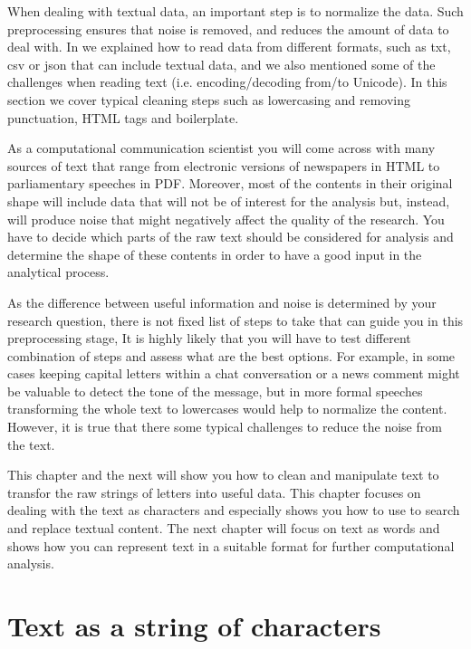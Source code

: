 When dealing with textual data, an important step is to normalize the data. Such preprocessing ensures that noise is removed, and reduces the amount of data to deal with. In  we explained how to read data from different formats, such as txt, csv or json that can include textual data, and we also mentioned some of the challenges when reading text (i.e. encoding/decoding from/to Unicode). In this section we cover typical cleaning steps such as lowercasing and removing punctuation, HTML tags and boilerplate.
 
As a computational communication scientist you will come across with many sources of text that range from electronic versions of newspapers in HTML to parliamentary speeches in PDF. Moreover, most of the contents in their original shape will include data that will not be of interest for the analysis but, instead,  will produce noise that might negatively affect the quality of the research. You have to decide which parts of the raw text should be considered for analysis and determine the shape of these contents in order to have a good input in the analytical process. 

As the difference between useful information and noise is determined by your research question, 
there is not fixed list of steps to take that can guide you in this preprocessing stage,
It is highly likely that you will have to test different combination of steps and assess what are the best options.
For example, in some cases keeping capital letters within a chat conversation or a news comment might be valuable to detect the tone of the message, but in more formal speeches transforming the whole text to lowercases would help to normalize the content.
However, it is true that there some typical challenges to reduce the noise from the text.

This chapter and the next will show you how to clean and manipulate text to transfor the raw strings of letters into useful data.
This chapter focuses on dealing with the text as characters and especially shows you how to use  to search and replace textual content.
The next chapter will focus on text as words and shows how you can represent text in a suitable format for further computational analysis. 

\section{Text as a string of characters}


